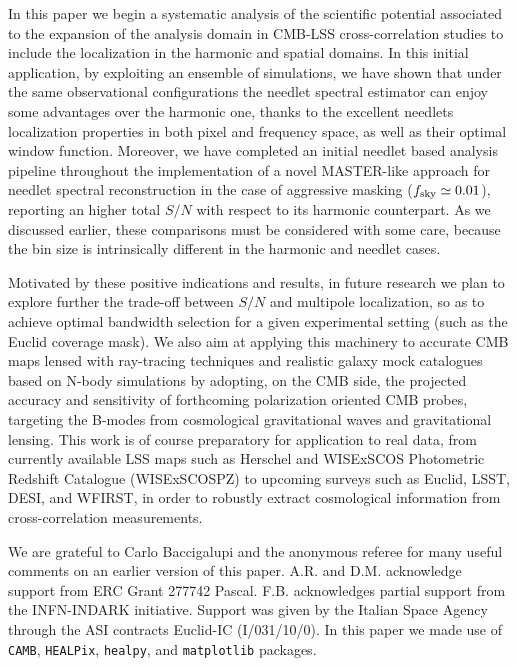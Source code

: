 \documentclass[a4paper,11pt]{article}
\begin{document}
In this paper we begin a systematic analysis of the scientific potential associated to the expansion of the analysis domain in CMB-LSS cross-correlation studies to include the localization in the harmonic and spatial domains. In this initial application, by exploiting an ensemble of 
simulations, we have shown that under the same observational configurations the needlet spectral
estimator can enjoy some advantages over the harmonic one, thanks to the excellent needlets localization properties in both pixel and frequency space, as well as their optimal window function. 
Moreover, we have completed an initial needlet based analysis pipeline throughout the implementation of a novel MASTER-like approach for needlet spectral reconstruction in the case of aggressive masking 
($f_{\rm sky}\simeq 0.01$), reporting an higher total $S/N$ with respect to its harmonic counterpart. As we discussed earlier, these comparisons must be considered with some care, because the bin size is intrinsically different in the harmonic and needlet cases.

Motivated by these positive indications and results, in future research we plan to explore further the 
trade-off between $S/N$ and multipole 
localization, so as to achieve optimal bandwidth selection for a given experimental setting (such as the 
Euclid coverage mask). We also aim at applying this machinery to accurate CMB maps lensed 
with ray-tracing techniques \cite{Calabrese2015} and realistic galaxy mock catalogues based on N-body 
simulations by adopting, on the CMB side, the projected accuracy and sensitivity of forthcoming polarization oriented CMB probes, targeting the B-modes from cosmological gravitational waves and gravitational lensing. 
This work is of course preparatory for application to real data, from currently available LSS 
maps such as Herschel and WISExSCOS Photometric Redshift Catalogue (WISExSCOSPZ) 
\cite{Bilicki2016} to upcoming surveys such as Euclid, LSST, DESI, and WFIRST, in order to robustly 
extract cosmological information from cross-correlation measurements.



\acknowledgments
We are grateful to Carlo Baccigalupi and the anonymous referee for many useful comments on an earlier version of this paper.
A.R. and D.M. acknowledge support from ERC Grant 277742 Pascal. 
F.B. acknowledges partial support from the INFN-INDARK initiative.
Support was given by the Italian Space Agency through the ASI contracts Euclid-IC (I/031/10/0). 
In this paper we made use of \texttt{CAMB}, \texttt{HEALPix}, \texttt{healpy}, and \texttt{matplotlib} packages.
\end{document}
